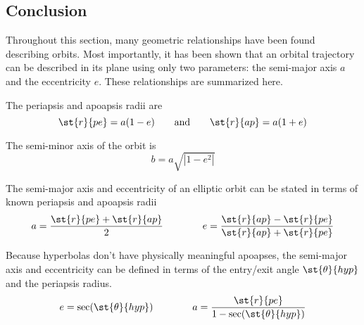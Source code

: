 \documentclass[../basicOrbitalDynamics.tex]{subfiles}
\begin{document}
\bigskip\bigskip
\subsection{Conclusion}

Throughout this section, many geometric relationships have been found describing orbits. Most importantly, it has been shown that an orbital trajectory can be described in its plane using only two parameters: the semi-major axis $a$ and the eccentricity $e$. These relationships are summarized here.

\bigskip
The periapsis and apoapsis radii are
$$\st{r}{pe}=a(1-e)\qquad\text{and}\qquad \st{r}{ap}=a(1+e)$$

\bigskip
The semi-minor axis of the orbit is
$$b=a\sqrt{|1-e^2|}$$

\bigskip
The semi-major axis and eccentricity of an elliptic orbit can be stated in terms of known periapsis and apoapsis radii
$$a=\frac{\st{r}{pe}+\st{r}{ap}}{2}\qquad\qquad e=\frac{\st{r}{ap}-\st{r}{pe}}{\st{r}{ap}+\st{r}{pe}}$$

Because hyperbolas don't have physically meaningful apoapses, the semi-major axis and eccentricity can be defined in terms of the entry/exit angle $\st{\theta}{hyp}$ and the periapsis radius.
$$e=\sec(\st{\theta}{hyp})\qquad\qquad a=\frac{{\st{r}{pe}}}{1-\sec(\st{\theta}{hyp})}$$
\end{document}
